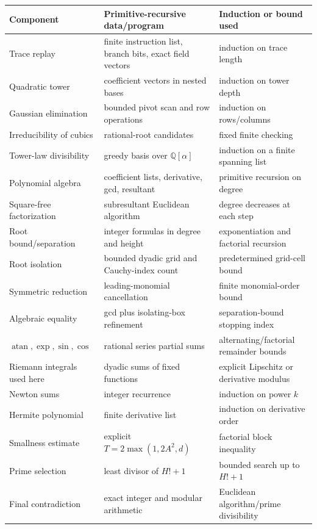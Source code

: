 \documentclass[11pt]{article}
\newcommand{\Q}{\mathbb{Q}}
\newcommand{\atan}{\operatorname{atan}}
\begin{document}
\begin{longtable}{@{}p{}p{}p{}@{}}
\toprule
Component & Primitive-recursive data/program & Induction or bound used \\
\midrule
\endhead
Trace replay & finite instruction list, branch bits, exact field vectors & induction on trace length \\
Quadratic tower & coefficient vectors in nested bases & induction on tower depth \\
Gaussian elimination & bounded pivot scan and row operations & induction on rows/columns \\
Irreducibility of cubics & rational-root candidates & fixed finite checking \\
Tower-law divisibility & greedy basis over $\Q[\alpha]$ & induction on a finite spanning list \\
Polynomial algebra & coefficient lists, derivative, gcd, resultant & primitive recursion on degree \\
Square-free factorization & subresultant Euclidean algorithm & degree decreases at each step \\
Root bound/separation & integer formulas in degree and height & exponentiation and factorial recursion \\
Root isolation & bounded dyadic grid and Cauchy-index count & predetermined grid-cell bound \\
Symmetric reduction & leading-monomial cancellation & finite monomial-order bound \\
Algebraic equality & gcd plus isolating-box refinement & separation-bound stopping index \\
$\atan,\exp,\sin,\cos$ & rational series partial sums & alternating/factorial remainder bounds \\
Riemann integrals used here & dyadic sums of fixed functions & explicit Lipschitz or derivative modulus \\
Newton sums & integer recurrence & induction on power $k$ \\
Hermite polynomial & finite derivative list & induction on derivative order \\
Smallness estimate & explicit $T=2\max(1,2A^2,d)$ & factorial block inequality \\
Prime selection & least divisor of $H!+1$ & bounded search up to $H!+1$ \\
Final contradiction & exact integer and modular arithmetic & Euclidean algorithm/prime divisibility \\
\bottomrule
\end{longtable}
\end{document}
